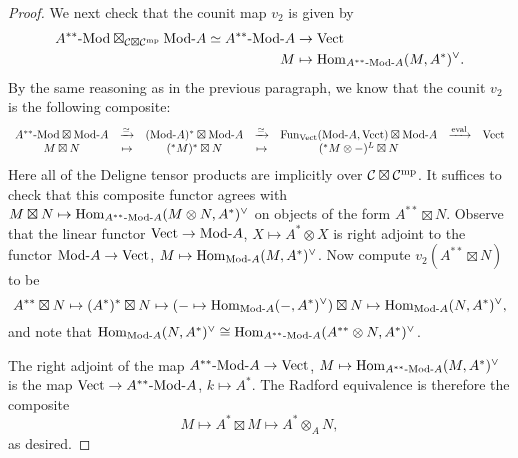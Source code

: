 \documentclass{amsart}
\begin{document}
\begin{proof}
We next check that the counit map $v_2$ is given by
\begin{align*}
\Mod{A^{**}}{} \boxtimes_{\cC \boxtimes \cC^\mp} \Mod{}{A} \simeq \Mod{A^{**}}{A} &\ra \Vect \\
M &\mapsto \Hom_{\Mod{A^{**}}{A}}(M,A^*)^\vee.
\end{align*}
By the same reasoning as in the previous paragraph, we know that the counit $v_2$ is the following composite:
\[
\begin{array}{ccccccc}
\Mod{A^{**}}{} \boxtimes \Mod{}{A} 
&\xra{\simeq}& (\Mod{}{A})^* \boxtimes \Mod{}{A} 
&\xra{\simeq}& \Fun_\Vect(\Mod{}{A},\Vect) \boxtimes \Mod{}{A} 
&\xra{\text{eval}}& \Vect
\\
M \boxtimes N 
&\mapsto& ({}^* M)^* \boxtimes N 
&\mapsto& ({}^* M \otimes -)^L \boxtimes N
&& 
\end{array}
\] %
Here all of the Deligne tensor products are implicitly over $\mathcal C \boxtimes \mathcal C^{\mathrm{mp}}$.  It suffices to check that this composite functor agrees with $M \boxtimes N \mapsto \Hom_{\Mod{A^{**}}{A}}(M \otimes N,A^*)^\vee$ on objects of the form $A^{**} \boxtimes N$.  Observe that the linear functor $\Vect \ra \Mod{}{A}$, $X \mapsto A^* \otimes X$ is right adjoint to the functor $\Mod{}{A} \ra \Vect$, $M \mapsto \Hom_{\Mod{}{A}}(M,A^*)^\vee$.  Now compute $v_2(A^{**} \boxtimes N)$ to be
\[
A^{**} \boxtimes N \mapsto (A^*)^* \boxtimes N \mapsto (- \mapsto \Hom_{\Mod{}{A}}(-,A^*)^\vee) \boxtimes N \mapsto \Hom_{\Mod{}{A}}(N,A^*)^\vee,
\]
and note that $\Hom_{\Mod{}{A}}(N,A^*)^\vee \cong \Hom_{\Mod{A^{**}}{A}}(A^{**} \otimes N,A^*)^\vee$.

The right adjoint of the map $\Mod{A^{**}}{A} \ra \Vect$, $M \mapsto \Hom_{\Mod{A^{**}}{A}}(M,A^*)^\vee$ is the map $\Vect \ra \Mod{A^{**}}{A}$, $k \mapsto A^*$.  The Radford equivalence is therefore the composite
\[
M \mapsto A^* \boxtimes M \mapsto A^* \otimes_A N,
\]
as desired.
\end{proof}
\end{document}
